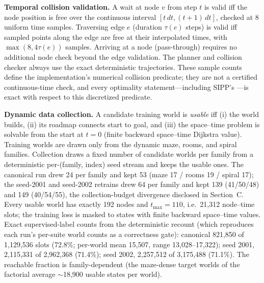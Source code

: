 \documentclass[letterpaper]{article} %
\begin{document}
\begin{table}[t]
\label{tab:archspec}
\end{table}

\textbf{Temporal collision validation.} A wait at node $v$ from step $t$ is valid iff the node position is free over the continuous interval $[t\,dt, (t{+}1)\,dt]$, checked at 8 uniform time samples. Traversing edge $e$ (duration $\tau(e)$ steps) is valid iff sampled points along the edge are free at their interpolated times, with $\max(8, 4\tau(e))$ samples. Arriving at a node (pass-through) requires no additional node check beyond the edge validation. The planner and collision checker always use the exact deterministic trajectories. These sample counts define the implementation's numerical collision predicate; they are not a certified continuous-time check, and every optimality statement---including SIPP's \citep{phillips2011sipp}---is exact with respect to this discretized predicate.

\textbf{Dynamic data collection.} A candidate training world is \emph{usable} iff (i) the world builds, (ii) its roadmap connects start to goal, and (iii) the space--time problem is solvable from the start at $t{=}0$ (finite backward space--time Dijkstra value). Training worlds are drawn only from the dynamic maze, rooms, and spiral families. Collection draws a fixed number of candidate worlds per family from a deterministic per-(family, index) seed stream and keeps the usable ones. The canonical run drew 24 per family and kept 53 (maze 17 / rooms 19 / spiral 17); the seed-2001 and seed-2002 retrains drew 64 per family and kept 139 (41/50/48) and 149 (40/54/55), the collection-budget divergence disclosed in Section~C. Every usable world has exactly 192 nodes and $t_{\max}{=}110$, i.e.\ 21{,}312 node--time slots; the training loss is masked to states with finite backward space--time values. Exact supervised-label counts from the deterministic recount (which reproduces each run's per-suite world counts as a correctness gate): canonical 821{,}850 of 1{,}129{,}536 slots (72.8\%; per-world mean 15{,}507, range 13{,}028--17{,}322); seed 2001, 2{,}115{,}331 of 2{,}962{,}368 (71.4\%); seed 2002, 2{,}257{,}512 of 3{,}175{,}488 (71.1\%). The reachable fraction is family-dependent (the maze-dense target worlds of the factorial average $\sim$18{,}900 usable states per world).
\end{document}
